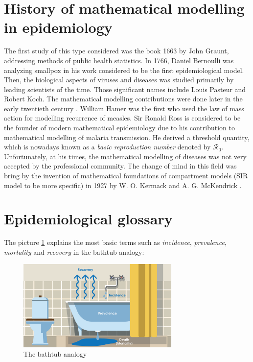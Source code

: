 \documentclass[
  digital, %
  oneside, %
  lof,     %
  lot,     %
]{fithesis4}
\begin{document}
\section{History of mathematical modelling in epidemiology}

The first study of this type considered was the book 1663 by 
John Graunt, addressing methods of public health statistics.
In 1766, Daniel Bernoulli was analyzing smallpox in his work 
considered to be the first epidemiological model.
Then, the biological aspects of viruses and diseases was 
studied primarily by leading scientists of the time.
Those significant names include Louis Pasteur and Robert Koch.
The mathematical modelling contributions were done later in
the early twentieth century \cite[Chapter~1.4]{martcheva2015}.
William Hamer was the first who used the law of 
mass action for modelling recurrence of measles. 
Sir Ronald Ross is considered to be the founder of 
modern mathematical epidemiology due to his contribution
to mathematical modelling of malaria
transmission. He derived a threshold quantity, which is 
nowadays known as a \textit{basic reproduction number}
denoted by $\mathcal{R}_0$.
Unfortunately, at his times, the mathematical modelling 
of diseases was not very accepted by the professional community.
The change of mind in this field was bring by the invention 
of mathematical foundations of compartment models
(SIR model to be more specific) in 1927 by W. O. Kermack and 
A. G. McKendrick \cite{kermack1927}.



\section{Epidemiological glossary}

The picture \ref{fig:epidemiologists-bathtub} explains the most basic
terms such as \textit{incidence}, \textit{prevalence}, \textit{mortality}
and \textit{recovery} in the bathtub analogy:

\begin{figure}[h]
  \begin{center}
    \includegraphics[width=8cm]{static/images/epidemiologists-bathtub.png}
  \end{center}
  \caption{The bathtub analogy \cite{steward2020}}
  \label{fig:epidemiologists-bathtub}
\end{figure}
\end{document}
